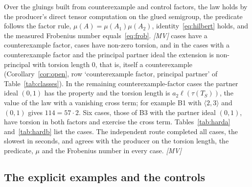 \documentclass[11pt]{article}
\theoremstyle{definition}
\theoremstyle{remark}
\newcommand{\tor}{\tau}
\newcommand{\len}{\ell}
\newcommand{\mMV}{\emph{[MV]}}
\begin{document}
Over the \NHard{} gluings built from counterexample and control factors, the law holds by the producer's direct tensor computation on the glued semigroup, the predicate follows the factor rule,
$\mu(A)=\mu(A_1)\mu(A_2)$, identity~\eqref{eq:hilbert} holds, and the measured Frobenius number equals~\eqref{eq:frob}. \mMV{} \NHardCE{} cases have a counterexample factor, \NHardNonzero{} cases have
non-zero torsion, and in the \NHardCEPrincipal{} cases with a counterexample factor and the principal partner ideal the extension is non-principal with torsion length $0$, that is, itself a counterexample
(Corollary~\ref{cor:open}, row `counterexample factor, principal partner' of Table~\ref{tab:classes}). In the remaining counterexample-factor cases the partner ideal $(0,1)$ has the property and the torsion
length is $a_2\len(\tor(T_S))$, the value of the law with a vanishing cross term; for example B1 with $\langle2,3\rangle$ and $(0,1)$ gives $114=57\cdot2$.
Six cases, those of B3 with the partner ideal $(0,1)$, have torsion in both factors and exercise the cross term. Tables~\ref{tab:harda} and~\ref{tab:hardb} list the cases. The independent
route completed all \NHard{} cases, the slowest in \HardAuditMax{} seconds, and agrees with the producer on the torsion length, the predicate, $\mu$ and the Frobenius number in every case. \mMV{}

\begin{table}[t]
\centering\footnotesize
\resizebox{\textwidth}{!}{}
\caption{The $24$ gluings with large factor B1 (Pham, ideal $(0,14)$, counterexample) or B3 (Pham, ideal $(0,1)$, with the property): partner semigroup and ideal, multipliers, torsion length from the law, directly computed length, independent auditor value, whether the extension has the property (HW; ``no'' is a counterexample), $\mu(A)$, pairs scanned and seconds of the direct computation.}\label{tab:harda}
\end{table}

\begin{table}[t]
\centering\footnotesize
\resizebox{\textwidth}{!}{}
\caption{The $24$ gluings with large factor B2 ($C_4$, ideal $(0,24)$) or B4 ($C_5$, ideal $(0,30)$), both counterexamples: the same columns as Table~\ref{tab:harda}. Every row with the partner ideal $(0)$ is an extension that is itself a counterexample, with torsion length zero.}\label{tab:hardb}
\end{table}

\subsection{The explicit examples and the controls}
\end{document}
